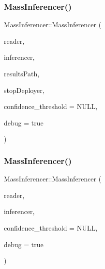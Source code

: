 \mbox{\label{class_mass_inferencer_a47dfb5d42669485a0390c579051e57f9}} 
\subsubsection{\texorpdfstring{Mass\+Inferencer()}{MassInferencer()}\hspace{0.1cm}{\footnotesize\ttfamily [3/5]}}
{\footnotesize\ttfamily Mass\+Inferencer\+::\+Mass\+Inferencer (\begin{DoxyParamCaption}\item[{\hyperlink{_dataset_reader_8h_a30d89cba514a220d64d04535c0465f1c}{Dataset\+Reader\+Ptr}}]{reader,  }\item[{\hyperlink{_framework_inferencer_8h_a7b59ebc4b080d1be0d1a6240703011f2}{Framework\+Inferencer\+Ptr}}]{inferencer,  }\item[{const std\+::string \&}]{results\+Path,  }\item[{bool $\ast$}]{stop\+Deployer,  }\item[{double $\ast$}]{confidence\+\_\+threshold = {\ttfamily NULL},  }\item[{bool}]{debug = {\ttfamily true} }\end{DoxyParamCaption})}

\mbox{\label{class_mass_inferencer_afc617523cbd7df73545cda0755e9ff77}} 
\subsubsection{\texorpdfstring{Mass\+Inferencer()}{MassInferencer()}\hspace{0.1cm}{\footnotesize\ttfamily [4/5]}}
{\footnotesize\ttfamily Mass\+Inferencer\+::\+Mass\+Inferencer (\begin{DoxyParamCaption}\item[{\hyperlink{_dataset_reader_8h_a30d89cba514a220d64d04535c0465f1c}{Dataset\+Reader\+Ptr}}]{reader,  }\item[{\hyperlink{_framework_inferencer_8h_a7b59ebc4b080d1be0d1a6240703011f2}{Framework\+Inferencer\+Ptr}}]{inferencer,  }\item[{double $\ast$}]{confidence\+\_\+threshold = {\ttfamily NULL},  }\item[{bool}]{debug = {\ttfamily true} }\end{DoxyParamCaption})}

